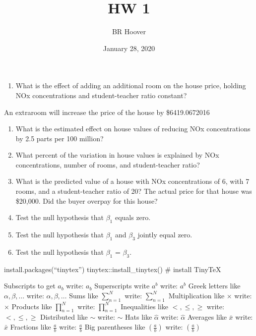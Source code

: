 \documentclass[
]{article}
\title{HW 1}
\author{BR Hoover}
\date{January 28, 2020}
\providecommand{\tightlist}{%
  \setlength{\itemsep}{0pt}\setlength{\parskip}{0pt}}
\begin{document}
\maketitle

\begin{enumerate}
\def\labelenumi{(\alph{enumi})}
\tightlist
\item
  What is the effect of adding an additional room on the house price,
  holding NOx concentrations and student-teacher ratio constant?
\end{enumerate}

An extraroom will increase the price of the house by \$6419.0672016

\begin{enumerate}
\def\labelenumi{(\alph{enumi})}
\setcounter{enumi}{1}
\item
  What is the estimated effect on house values of reducing NOx
  concentrations by 2.5 parts per 100 million?
\item
  What percent of the variation in house values is explained by NOx
  concentrations, number of rooms, and student-teacher ratio?
\item
  What is the predicted value of a house with NOx concentrations of 6,
  with 7 rooms, and a student-teacher ratio of 20? The actual price for
  that house was \$20,000. Did the buyer overpay for this house?
\item
  Test the null hypothesis that \(β_{1}\) equals zero.
\item
  Test the null hypothesis that \(β_{1}\) and \(β_{3}\) jointly equal
  zero.
\item
  Test the null hypothesis that \(β_{1}\) = \(β_{3}\).
\end{enumerate}

install.packages(``tinytex'') tinytex::install\_tinytex() \# install
TinyTeX

Subscripts to get \(a_{b}\) write: \(a_{b}\) Superscripts write
\(a^{b}\) write: \(a^{b}\) Greek letters like \(\alpha, \beta, \ldots\)
write: \(\alpha, \beta, \ldots\) Sums like \(\sum_{n=1}^N\) write:
\(\sum_{n=1}^N\) Multiplication like \(\times\) write: \(\times\)
Products like \(\prod_{n=1}^N\) write: \(\prod_{n=1}^N\) Inequalities
like \(<, \leq, \geq\) write: \(<, \leq, \geq\) Distributed like
\(\sim\) write: \(\sim\) Hats like \(\widehat{\alpha}\) write:
\(\widehat{\alpha}\) Averages like \(\bar{x}\) write: \(\bar{x}\)
Fractions like \(\frac{a}{b}\) write: \(\frac{a}{b}\) Big parentheses
like \(\left(\frac{a}{b}\right)\) write: \(\left(\frac{a}{b}\right)\)
\end{document}
